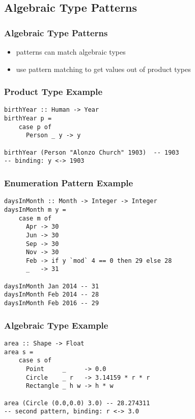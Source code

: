 \documentclass[dvipsnames]{beamer}
\theoremstyle{plain}
\begin{document}
\subsection{Algebraic Type Patterns}

\begin{frame}
  \frametitle{Algebraic Type Patterns}

  \begin{itemize}
    \item patterns can match algebraic types
    \item use pattern matching to get values out of product types
  \end{itemize}
\end{frame}

\begin{frame}[fragile]
  \frametitle{Product Type Example}

  \begin{lstlisting}
birthYear :: Human -> Year
birthYear p =
    case p of
      Person _ y -> y

birthYear (Person "Alonzo Church" 1903)  -- 1903
-- binding: y <-> 1903
  \end{lstlisting}
\end{frame}

\begin{frame}[fragile]
  \frametitle{Enumeration Pattern Example}

  \begin{lstlisting}
daysInMonth :: Month -> Integer -> Integer
daysInMonth m y =
    case m of
      Apr -> 30
      Jun -> 30
      Sep -> 30
      Nov -> 30
      Feb -> if y `mod` 4 == 0 then 29 else 28
      _   -> 31

daysInMonth Jan 2014 -- 31
daysInMonth Feb 2014 -- 28
daysInMonth Feb 2016 -- 29
    \end{lstlisting}
\end{frame}

\begin{frame}[fragile]
  \frametitle{Algebraic Type Example}

  \begin{lstlisting}
area :: Shape -> Float
area s =
    case s of
      Point     _     -> 0.0
      Circle    _ r   -> 3.14159 * r * r
      Rectangle _ h w -> h * w

area (Circle (0.0,0.0) 3.0) -- 28.274311
-- second pattern, binding: r <-> 3.0
  \end{lstlisting}
\end{frame}
\end{document}
